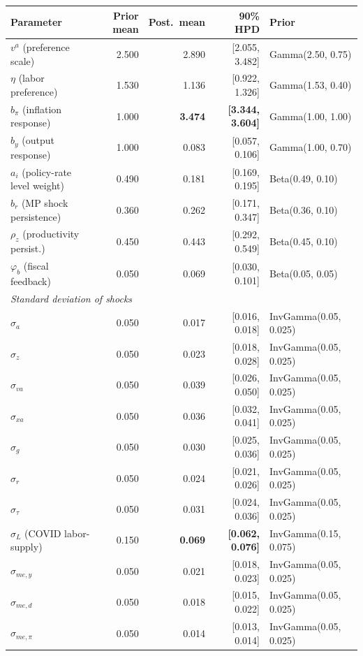 \documentclass[11pt]{article}
\begin{document}
\begin{table}[h]
\centering
\small
\begin{tabular}{lrrrl}
\toprule
Parameter & Prior mean & Post.\ mean & 90\% HPD & Prior \\
\midrule
$v^a$ (preference scale)        & 2.500 & 2.890 & [2.055, 3.482] & Gamma(2.50, 0.75) \\
$\eta$ (labor preference)       & 1.530 & 1.136 & [0.922, 1.326] & Gamma(1.53, 0.40) \\
$b_\pi$ (inflation response)    & 1.000 & \textbf{3.474} & \textbf{[3.344, 3.604]} & Gamma(1.00, 1.00) \\
$b_y$ (output response)         & 1.000 & 0.083 & [0.057, 0.106] & Gamma(1.00, 0.70) \\
$a_i$ (policy-rate level weight)& 0.490 & 0.181 & [0.169, 0.195] & Beta(0.49, 0.10) \\
$b_r$ (MP shock persistence)    & 0.360 & 0.262 & [0.171, 0.347] & Beta(0.36, 0.10) \\
$\rho_z$ (productivity persist.)& 0.450 & 0.443 & [0.292, 0.549] & Beta(0.45, 0.10) \\
$\varphi_b$ (fiscal feedback)   & 0.050 & 0.069 & [0.030, 0.101] & Beta(0.05, 0.05) \\
\midrule
\multicolumn{5}{l}{\textit{Standard deviation of shocks}} \\
$\sigma_a$   & 0.050 & 0.017 & [0.016, 0.018] & InvGamma(0.05, 0.025) \\
$\sigma_z$   & 0.050 & 0.023 & [0.018, 0.028] & InvGamma(0.05, 0.025) \\
$\sigma_{va}$& 0.050 & 0.039 & [0.026, 0.050] & InvGamma(0.05, 0.025) \\
$\sigma_{xa}$& 0.050 & 0.036 & [0.032, 0.041] & InvGamma(0.05, 0.025) \\
$\sigma_g$   & 0.050 & 0.030 & [0.025, 0.036] & InvGamma(0.05, 0.025) \\
$\sigma_r$   & 0.050 & 0.024 & [0.021, 0.026] & InvGamma(0.05, 0.025) \\
$\sigma_\tau$& 0.050 & 0.031 & [0.024, 0.036] & InvGamma(0.05, 0.025) \\
$\sigma_L$ (COVID labor-supply) & 0.150 & \textbf{0.069} & \textbf{[0.062, 0.076]} & InvGamma(0.15, 0.075) \\
$\sigma_{me,y}$   & 0.050 & 0.021 & [0.018, 0.023] & InvGamma(0.05, 0.025) \\
$\sigma_{me,d}$   & 0.050 & 0.018 & [0.015, 0.022] & InvGamma(0.05, 0.025) \\
$\sigma_{me,\pi}$ & 0.050 & 0.014 & [0.013, 0.014] & InvGamma(0.05, 0.025) \\

\end{tabular}
\end{table}
\end{document}
